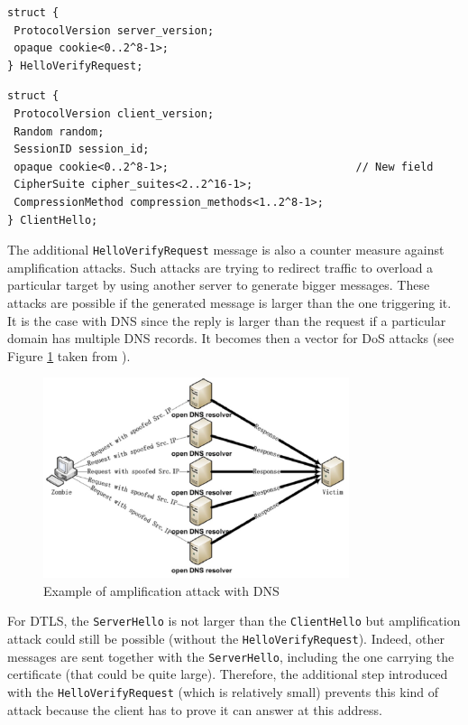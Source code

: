 \begin{lstlisting}[caption=DTLS HelloVerifyRequest message, label=lst:dtls-helloverify]
struct {
 ProtocolVersion server_version;
 opaque cookie<0..2^8-1>;
} HelloVerifyRequest;
\end{lstlisting}


\begin{lstlisting}[caption=DTLS ClientHello adapted message, label=lst:dtls-clienthello]
struct {
 ProtocolVersion client_version;
 Random random;
 SessionID session_id;
 opaque cookie<0..2^8-1>;                             // New field
 CipherSuite cipher_suites<2..2^16-1>;
 CompressionMethod compression_methods<1..2^8-1>;
} ClientHello;
\end{lstlisting}

The additional \texttt{HelloVerifyRequest} message is also a counter measure against amplification attacks. Such attacks are trying to redirect traffic to overload a particular target by using another server to generate bigger messages. These attacks are possible if the generated message is larger than the one triggering it. It is the case with DNS since the reply is larger than the request if a particular domain has multiple DNS records. It becomes then a vector for DoS attacks (see Figure \ref{fig:amp_attack} taken from \cite{dns-amp}).


\begin{figure}[!ht]
\centering
\includegraphics[width=0.8\textwidth]{images/amplificationattacks}
\caption{Example of amplification attack with DNS}
\label{fig:amp_attack}
\end{figure}

For DTLS, the \texttt{ServerHello} is not larger than the \texttt{ClientHello} but amplification attack could still be possible (without the \texttt{HelloVerifyRequest}). Indeed, other messages are sent together with the \texttt{ServerHello}, including the one carrying the certificate (that could be quite large). Therefore, the additional step introduced with the \texttt{HelloVerifyRequest} (which is relatively small) prevents this kind of attack because the client has to prove it can answer at this address.

